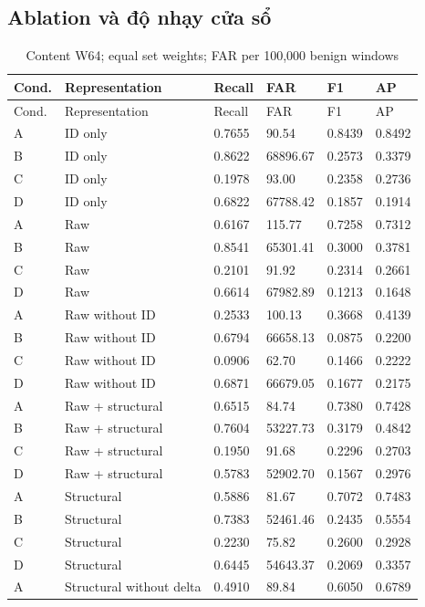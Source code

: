 \documentclass[12pt,a4paper,oneside,openany]{extbook}
\begin{document}
\subsection{Ablation và độ nhạy cửa sổ}
\begin{longtable}{P{1.1cm}P{4.2cm}P{1.6cm}P{2.2cm}P{1.6cm}P{1.6cm}}
\caption{Content W64; equal set weights; FAR per 100,000 benign windows}\label{tab:extension-w64}\\\toprule
Cond. & Representation & Recall & FAR & F1 & AP\\\midrule\endfirsthead
\toprule
Cond. & Representation & Recall & FAR & F1 & AP\\\midrule\endhead
A & ID only & 0.7655 & 90.54 & 0.8439 & 0.8492\\
B & ID only & 0.8622 & 68896.67 & 0.2573 & 0.3379\\
C & ID only & 0.1978 & 93.00 & 0.2358 & 0.2736\\
D & ID only & 0.6822 & 67788.42 & 0.1857 & 0.1914\\
A & Raw & 0.6167 & 115.77 & 0.7258 & 0.7312\\
B & Raw & 0.8541 & 65301.41 & 0.3000 & 0.3781\\
C & Raw & 0.2101 & 91.92 & 0.2314 & 0.2661\\
D & Raw & 0.6614 & 67982.89 & 0.1213 & 0.1648\\
A & Raw without ID & 0.2533 & 100.13 & 0.3668 & 0.4139\\
B & Raw without ID & 0.6794 & 66658.13 & 0.0875 & 0.2200\\
C & Raw without ID & 0.0906 & 62.70 & 0.1466 & 0.2222\\
D & Raw without ID & 0.6871 & 66679.05 & 0.1677 & 0.2175\\
A & Raw + structural & 0.6515 & 84.74 & 0.7380 & 0.7428\\
B & Raw + structural & 0.7604 & 53227.73 & 0.3179 & 0.4842\\
C & Raw + structural & 0.1950 & 91.68 & 0.2296 & 0.2703\\
D & Raw + structural & 0.5783 & 52902.70 & 0.1567 & 0.2976\\
A & Structural & 0.5886 & 81.67 & 0.7072 & 0.7483\\
B & Structural & 0.7383 & 52461.46 & 0.2435 & 0.5554\\
C & Structural & 0.2230 & 75.82 & 0.2600 & 0.2928\\
D & Structural & 0.6445 & 54643.37 & 0.2069 & 0.3357\\
A & Structural without delta & 0.4910 & 89.84 & 0.6050 & 0.6789\\

\end{longtable}
\end{document}
